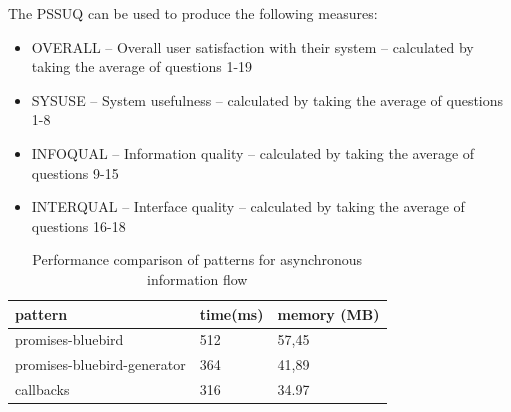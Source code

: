 The PSSUQ can be used to produce the following measures:
\begin{itemize}
	\item OVERALL – Overall user satisfaction with their system – calculated by taking the average of questions 1-19
	\item SYSUSE – System usefulness – calculated by taking the average of questions 1-8
	\item INFOQUAL – Information quality – calculated by taking the average of questions 9-15
	\item INTERQUAL – Interface quality – calculated by taking the average of questions 16-18
\end{itemize}
\begin{table}[h]
	\begin{center}
		\begin{tabular}{| l | l | l | }
			\hline
			\textbf{pattern} & \textbf{time(ms)} & \textbf{memory (MB)} \\
			\hline
			promises-bluebird & 512 & 57,45 \\
			\hline
			promises-bluebird-generator & 364 & 41,89 \\
			\hline
			callbacks & 316 & 34.97 \\
			\hline
		\end{tabular}
	\end{center}
	\caption{Performance comparison of patterns for asynchronous information flow \cite{asyncPerformance_2}\cite{asyncPerformance}}
\end{table}
